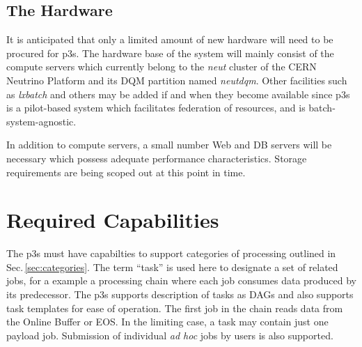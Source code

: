\documentclass[pdftex,12pt,letter]{article}
\begin{document}
\subsection{The Hardware}
It is anticipated that only a limited amount of new hardware will need to be procured
for p3s. The hardware base of the system will mainly consist of the compute servers
which currently belong to the \textit{neut} cluster of the CERN Neutrino Platform
\cite{neut}
and its DQM partition named \textit{neutdqm}. Other facilities such as \textit{lxbatch}
\cite{lxbatch}
and others may be added if and when they become available since p3s is a pilot-based
system which facilitates federation of resources, and is batch-system-agnostic.

In addition to compute servers, a small number Web and DB servers will be necessary
which possess adequate performance characteristics. Storage requirements are being
scoped out at this point in time.



\section{Required Capabilities}
\label{sec:capabilities}

The p3s must have capabilties to support categories of processing outlined
in Sec.\,\ref{sec:categories}. The term ``task'' is used here to designate a set
of related jobs, for a example a processing chain where each job consumes
data produced by its predecessor. The p3s supports description of tasks as DAGs
and also supports task templates for ease of operation.
 The first job in the chain reads data from
the Online Buffer or EOS. In the limiting case, a task may contain just one payload
job. Submission of individual \textit{ad hoc} jobs by users is also supported.
\end{document}
